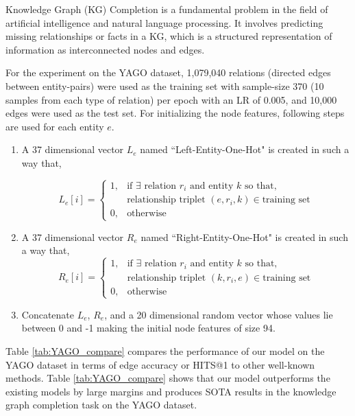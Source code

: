 Knowledge Graph (KG) Completion is a fundamental problem in the field of artificial intelligence and natural language processing. It involves predicting missing relationships or facts in a KG, which is a structured representation of information as interconnected nodes and edges.  

For the experiment on the YAGO dataset, 1,079,040 relations (directed edges between entity-pairs) were used as the training set with sample-size 370 (10 samples from each type of relation) per epoch with an LR of 0.005, and 10,000 edges were used as the test set. For initializing the node features, following steps are used for each entity $e$.
\begin{enumerate}
\item A 37 dimensional vector $L_e$ named ``Left-Entity-One-Hot" is created in such a way that,

\vspace*{-\baselineskip}
\[
    L_e[i]= 
\begin{cases}
    1,              & \text{if } \exists \text{ relation } r_i \text{ and entity } k \text{ so that,}\\
    & \text{relationship triplet }(e,r_i,k) \in \text{training set}\\
    0,              & \text{otherwise}
\end{cases}
\]
\item A 37 dimensional vector $R_e$ named ``Right-Entity-One-Hot" is created in such a way that,
\[
    R_e[i]= 
\begin{cases}
    1,              & \text{if } \exists \text{ relation } r_i \text{ and entity } k \text{ so that,}\\
    & \text{relationship triplet }(k,r_i,e) \in \text{training set}\\
    0,              & \text{otherwise}
\end{cases}
\]
\item Concatenate $L_e$, $R_e$, and a 20 dimensional random vector whose values lie between 0 and -1 making the initial node features of size 94.
\end{enumerate}
Table \ref{tab:YAGO_compare} compares the performance of our model on the YAGO dataset in terms of edge accuracy or HITS@1 to other well-known methods. Table \ref{tab:YAGO_compare} shows that our model outperforms the existing models by large margins and produces SOTA results in the knowledge graph completion task on the YAGO dataset.